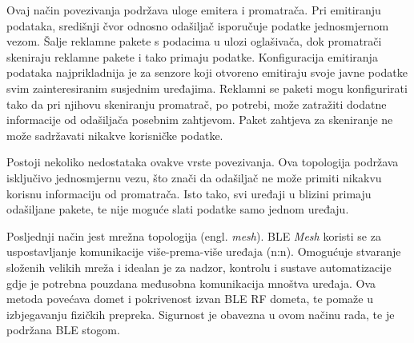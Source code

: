 Ovaj način povezivanja podržava uloge emitera i promatrača. Pri emitiranju podataka, središnji čvor odnosno odašiljač isporučuje podatke jednosmjernom vezom. Šalje reklamne pakete s podacima u ulozi oglašivača, dok promatrači skeniraju reklamne pakete i tako primaju podatke. Konfiguracija emitiranja podataka najprikladnija je za senzore koji otvoreno emitiraju svoje javne podatke svim zainteresiranim susjednim uređajima. Reklamni se paketi mogu konfigurirati tako da pri njihovu skeniranju promatrač, po potrebi, može zatražiti dodatne informacije od odašiljača posebnim zahtjevom. Paket zahtjeva za skeniranje ne može sadržavati nikakve korisničke podatke.

Postoji nekoliko nedostataka ovakve vrste povezivanja. Ova topologija podržava isključivo jednosmjernu vezu, što znači da odašiljač ne može primiti nikakvu korisnu informaciju od promatrača. Isto tako, svi uređaji u blizini primaju odašiljane pakete, te nije moguće slati podatke samo jednom uređaju. 

Posljednji način jest mrežna topologija (engl. \textit{mesh}). BLE \textit{Mesh} koristi se za uspostavljanje komunikacije više-prema-više uređaja (n:n). Omogućuje stvaranje složenih velikih mreža i idealan je za nadzor, kontrolu i sustave automatizacije gdje je potrebna pouzdana međusobna komunikacija mnoštva uređaja. Ova metoda povećava domet i pokrivenost izvan BLE RF dometa, te pomaže u izbjegavanju fizičkih prepreka. Sigurnost je obavezna u ovom načinu rada, te je podržana BLE stogom. \cite{ble_profiles}


\eject